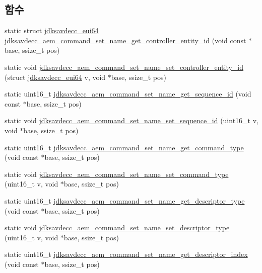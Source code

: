 \subsection*{함수}
\begin{DoxyCompactItemize}
\item 
static struct \hyperlink{structjdksavdecc__eui64}{jdksavdecc\+\_\+eui64} \hyperlink{group__command__set__name_ga99cad456bbba994ea83aafcd24c90ac9}{jdksavdecc\+\_\+aem\+\_\+command\+\_\+set\+\_\+name\+\_\+get\+\_\+controller\+\_\+entity\+\_\+id} (void const $\ast$base, ssize\+\_\+t pos)
\item 
static void \hyperlink{group__command__set__name_gab3ea40e294e7ad66108627c0f1df4b7d}{jdksavdecc\+\_\+aem\+\_\+command\+\_\+set\+\_\+name\+\_\+set\+\_\+controller\+\_\+entity\+\_\+id} (struct \hyperlink{structjdksavdecc__eui64}{jdksavdecc\+\_\+eui64} v, void $\ast$base, ssize\+\_\+t pos)
\item 
static uint16\+\_\+t \hyperlink{group__command__set__name_gae1ecedfc7d64ab168e14d8c9bb5cdddd}{jdksavdecc\+\_\+aem\+\_\+command\+\_\+set\+\_\+name\+\_\+get\+\_\+sequence\+\_\+id} (void const $\ast$base, ssize\+\_\+t pos)
\item 
static void \hyperlink{group__command__set__name_ga00b5f7c449fc544e59a8c4ec40ccce96}{jdksavdecc\+\_\+aem\+\_\+command\+\_\+set\+\_\+name\+\_\+set\+\_\+sequence\+\_\+id} (uint16\+\_\+t v, void $\ast$base, ssize\+\_\+t pos)
\item 
static uint16\+\_\+t \hyperlink{group__command__set__name_ga57baf2a92f476b2fe6b5b9b677bf9927}{jdksavdecc\+\_\+aem\+\_\+command\+\_\+set\+\_\+name\+\_\+get\+\_\+command\+\_\+type} (void const $\ast$base, ssize\+\_\+t pos)
\item 
static void \hyperlink{group__command__set__name_ga49867662a4fcbd354976295a28caaf91}{jdksavdecc\+\_\+aem\+\_\+command\+\_\+set\+\_\+name\+\_\+set\+\_\+command\+\_\+type} (uint16\+\_\+t v, void $\ast$base, ssize\+\_\+t pos)
\item 
static uint16\+\_\+t \hyperlink{group__command__set__name_ga497a7e4d98b47ceca126a974323f71e9}{jdksavdecc\+\_\+aem\+\_\+command\+\_\+set\+\_\+name\+\_\+get\+\_\+descriptor\+\_\+type} (void const $\ast$base, ssize\+\_\+t pos)
\item 
static void \hyperlink{group__command__set__name_ga558417c3de2544b4d6588ba38bec27c7}{jdksavdecc\+\_\+aem\+\_\+command\+\_\+set\+\_\+name\+\_\+set\+\_\+descriptor\+\_\+type} (uint16\+\_\+t v, void $\ast$base, ssize\+\_\+t pos)
\item 
static uint16\+\_\+t \hyperlink{group__command__set__name_gaf3f01f5644f0d3adc2dc5d992c000d59}{jdksavdecc\+\_\+aem\+\_\+command\+\_\+set\+\_\+name\+\_\+get\+\_\+descriptor\+\_\+index} (void const $\ast$base, ssize\+\_\+t pos)

\end{DoxyCompactItemize}
